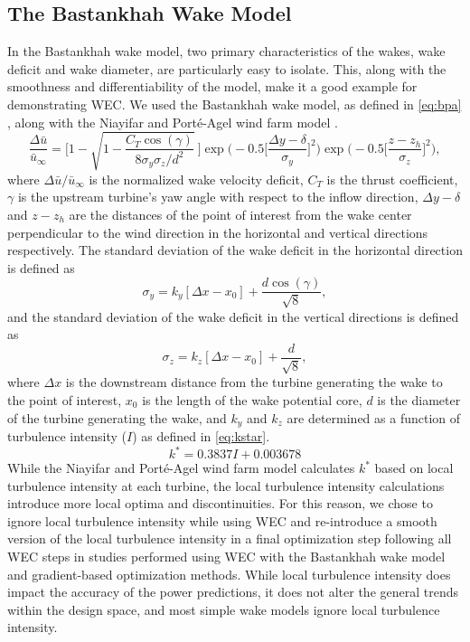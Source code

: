 \documentclass[hidelinks,sort&compress,AMA,STIX1COL]{WileyNJD-v2}
\begin{document}
\subsection{The Bastankhah Wake Model}
In the Bastankhah wake model, two primary characteristics of the wakes, wake deficit and wake diameter, are particularly easy to isolate. This, along with the smoothness and differentiability of the model, make it a good example for demonstrating WEC. We used the Bastankhah wake model, as defined in \cref{eq:bpa} \cite{bastankhah2016}, along with the Niayifar and Port\'e-Agel wind farm model \cite{niayifar2016}.
%
\begin{equation}
	\frac{\Delta \bar{u}}{\bar{u}_{\infty}} = \Bigg[1-\sqrt{1-\frac{C_T \cos{(\gamma)}}{8 \sigma_y \sigma_z/d^2}}~\Bigg] \exp{\bigg(-0.5\Big[\frac{\Delta y-\delta}{\sigma_y}\Big]^2\bigg)}\exp{\bigg(-0.5\Big[\frac{z-z_h}{\sigma_z}\Big]^2\bigg)},
	 \label{eq:bpa}
\end{equation}
%
where $\Delta \bar{u} / \bar{u}_{\infty}$ is the normalized wake velocity deficit, $C_T$ is the thrust coefficient, $\gamma$ is the upstream turbine's yaw angle with respect to the inflow direction, $\Delta y-\delta$ and $z-z_h$ are the distances of the point of interest from the wake center perpendicular to the wind direction in the horizontal and vertical directions respectively. The standard deviation of the wake deficit in the horizontal direction is defined as
%
\begin{equation}\label{eq:sigmay}
	\sigma_y = k_y [\Delta x - x_0] + \frac{d \cos{(\gamma)}}{\sqrt{8}},
\end{equation}
and the standard deviation of the wake deficit in the vertical directions is defined as
\begin{equation}\label{eq:sigmaz}
	\sigma_z = k_z [\Delta x - x_0] + \frac{d}{\sqrt{8}},
\end{equation}
%
where $\Delta x$ is the downstream distance from the turbine generating the wake to the point of interest, $x_0$ is the length of the wake potential core, $d$ is the diameter of the turbine generating the wake, and $k_y$ and $k_z$ are determined as a function of turbulence intensity ($I$) as defined in \cref{eq:kstar}\cite{niayifar2016}.
%
\begin{equation}\label{eq:kstar}
	k^* = 0.3837I + 0.003678
\end{equation}
%
While the Niayifar and Port\'e-Agel wind farm model calculates $k^*$ based on local turbulence intensity at each turbine, the local turbulence intensity calculations introduce more local optima and discontinuities. For this reason, we chose to ignore local turbulence intensity while using WEC and re-introduce a smooth version of the local turbulence intensity in a final optimization step following all WEC steps in studies performed using WEC with the Bastankhah wake model and gradient-based optimization methods. While local turbulence intensity does impact the accuracy of the power predictions, it does not alter the general trends within the design space, and most simple wake models ignore local turbulence intensity. 
\end{document}
